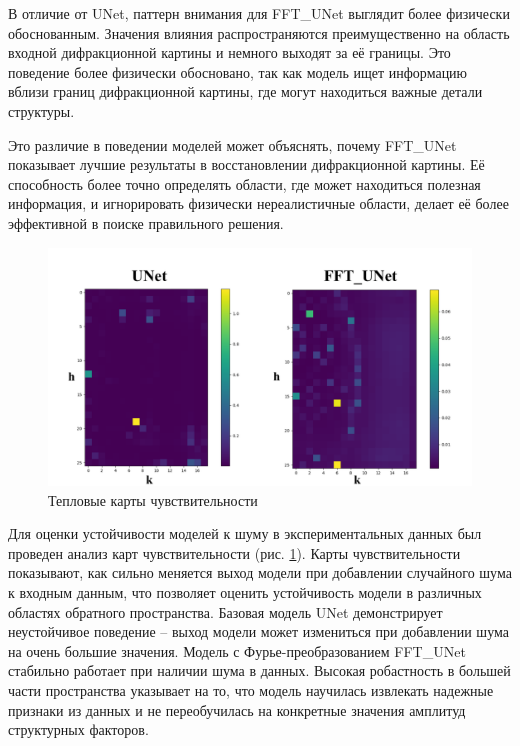 В отличие от UNet, паттерн внимания для FFT\_UNet выглядит более физически обоснованным. Значения влияния распространяются преимущественно на область входной дифракционной картины и немного выходят за её границы. Это поведение более физически обосновано, так как модель ищет информацию вблизи границ дифракционной картины, где могут находиться важные детали структуры. 

Это различие в поведении моделей может объяснять, почему FFT\_UNet показывает лучшие результаты в восстановлении дифракционной картины. Её способность более точно определять области, где может находиться полезная информация, и игнорировать физически нереалистичные области, делает её более эффективной в поиске правильного решения.



\begin{figure}[H]
    \centering
    \includegraphics[width=1\textwidth]{figures/sensitivity.png}
    \caption{Тепловые карты чувствительности}
    \label{sens}
\end{figure}


Для оценки устойчивости моделей к шуму в экспериментальных данных был проведен анализ карт чувствительности (рис. \ref{sens}). Карты чувствительности показывают, как сильно меняется выход модели при добавлении случайного шума к входным данным, что позволяет оценить устойчивость модели в различных областях обратного пространства. Базовая модель UNet демонстрирует неустойчивое поведение – выход модели может измениться при добавлении шума на очень большие значения. Модель с Фурье-преобразованием FFT\_UNet стабильно работает при наличии шума в данных. Высокая робастность в большей части пространства указывает на то, что модель научилась извлекать надежные признаки из данных и не переобучилась на конкретные значения амплитуд структурных факторов. 


